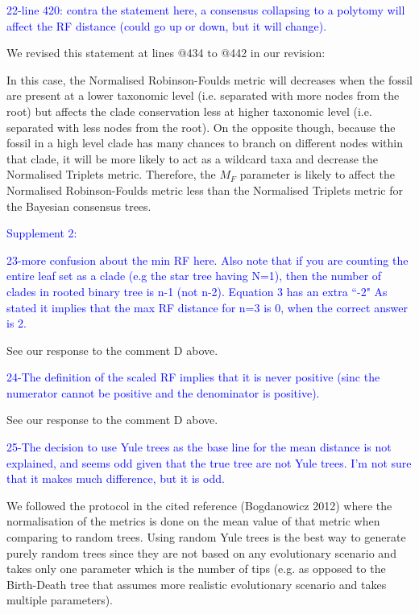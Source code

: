 \documentclass[11pt]{letter}
\begin{document}
\begin{letter}{}
\textcolor{blue}{22-line 420: contra the statement here, a consensus collapsing to a polytomy will affect the RF distance (could go up or down, but it will change).}

We revised this statement at lines @434 to @442 in our revision:

\hfill\begin{minipage}{\dimexpr\textwidth-1cm}
In this case, the Normalised Robinson-Foulds metric will decreases when the fossil are present at a lower taxonomic level (i.e. separated with more nodes from the root) but affects the clade conservation less at higher taxonomic level (i.e. separated with less nodes from the root). On the opposite though, because the fossil in a high level clade has many chances to branch on different nodes within that clade, it will be more likely to act as a wildcard taxa and decrease the Normalised Triplets metric. Therefore, the $M_{F}$ parameter is likely to affect the Normalised Robinson-Foulds metric less than the Normalised Triplets metric for the Bayesian consensus trees.
\end{minipage}

\textcolor{blue}{Supplement 2:}

\textcolor{blue}{23-more confusion about the min RF here. Also note that if you are counting the entire leaf set as a clade (e.g the star tree having N=1), then the number of clades in rooted binary tree is n-1 (not n-2). Equation 3 has an extra ``-2" As stated it implies that the max RF distance for n=3 is 0, when the correct answer is 2.}

See our response to the comment D above.

\textcolor{blue}{24-The definition of the scaled RF implies that it is never positive (sinc the numerator cannot be positive and the denominator is positive).}

See our response to the comment D above.

\textcolor{blue}{25-The decision to use Yule trees as the base line for the mean distance is not explained, and seems odd given that the true tree are not Yule trees. I'm not sure that it makes much difference, but it is odd.}

We followed the protocol in the cited reference (Bogdanowicz 2012) where the normalisation of the metrics is done on the mean value of that metric when comparing to random trees. Using random Yule trees is the best way to generate purely random trees since they are not based on any evolutionary scenario and takes only one parameter which is the number of tips (e.g. as opposed to the Birth-Death tree that assumes more realistic evolutionary scenario and takes multiple parameters).


\end{letter}
\end{document}
